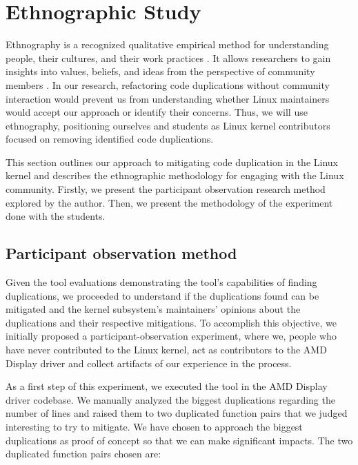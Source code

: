 \section{Ethnographic Study}

\label{sec:meteth}

Ethnography is a recognized qualitative empirical method for understanding people, 
their cultures, and their work practices \citep{bookethno}. It allows researchers 
to gain insights into values, beliefs, and ideas from the perspective of community 
members \citep{ethnosoft}. In our research, refactoring code duplications without 
community interaction would prevent us from understanding whether Linux maintainers 
would accept our approach or identify their concerns. Thus, we will use ethnography, 
positioning ourselves and students as Linux kernel contributors focused on removing 
identified  code duplications.

This section outlines our approach to mitigating code duplication in the Linux kernel 
and describes the ethnographic methodology for engaging with the Linux community. 
Firstly, we present the participant observation research method explored by the author. 
Then, we present the methodology of the experiment done with the students.

\subsection{Participant observation method}
\label{subsec:partmethod}

Given the tool evaluations demonstrating the tool's capabilities of finding duplications, 
we proceeded to understand if the duplications found can be mitigated and the kernel 
subsystem's maintainers' opinions about the duplications and their respective mitigations. 
To accomplish this objective, we initially proposed a participant-observation experiment, 
where we, people who have never contributed to the Linux kernel, act as contributors to 
the AMD Display driver and collect artifacts of our experience in the process.

As a first step of this experiment, we executed the tool in the AMD Display driver codebase. 
We manually analyzed the biggest duplications regarding the number of lines and raised them 
to two duplicated function pairs that we judged interesting to try to mitigate. We have 
chosen to approach the biggest duplications as proof of concept so that we can make 
significant impacts. The two duplicated function pairs chosen are:

